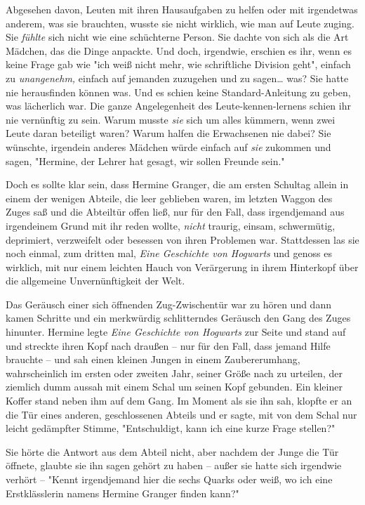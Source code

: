 {Abgesehen davon, Leuten mit ihren Hausaufgaben zu helfen oder mit irgendetwas anderem, was sie brauchten, wusste sie nicht wirklich, wie man auf Leute zuging. Sie \emph{fühlte} sich nicht wie eine schüchterne Person. Sie dachte von sich als die Art Mädchen, das die Dinge anpackte. Und doch, irgendwie, erschien es ihr, wenn es keine Frage gab wie "ich weiß nicht mehr, wie schriftliche Division geht", einfach zu \emph{unangenehm,} einfach auf jemanden zuzugehen und zu sagen… was? Sie hatte nie herausfinden können was. Und es schien keine Standard-Anleitung zu geben, was lächerlich war. Die ganze Angelegenheit des Leute-kennen-lernens schien ihr nie vernünftig zu sein. Warum musste \emph{sie} sich um alles kümmern, wenn zwei Leute daran beteiligt waren? Warum halfen die Erwachsenen nie dabei? Sie wünschte, irgendein anderes Mädchen würde einfach auf \emph{sie} zukommen und sagen, "Hermine, der Lehrer hat gesagt, wir sollen Freunde sein."

Doch es sollte klar sein, dass Hermine Granger, die am ersten Schultag allein in einem der wenigen Abteile, die leer geblieben waren, im letzten Waggon des Zuges saß und die Abteiltür offen ließ, nur für den Fall, dass irgendjemand aus irgendeinem Grund mit ihr reden wollte, \emph{nicht} traurig, einsam, schwermütig, deprimiert, verzweifelt oder besessen von ihren Problemen war. Stattdessen las sie noch einmal, zum dritten mal, \emph{Eine Geschichte von Hogwarts} und genoss es wirklich, mit nur einem leichten Hauch von Verärgerung in ihrem Hinterkopf über die allgemeine Unvernünftigkeit der Welt.

Das Geräusch einer sich öffnenden Zug-Zwischentür war zu hören und dann kamen Schritte und ein merkwürdig schlitterndes Geräusch den Gang des Zuges hinunter. Hermine legte \emph{Eine Geschichte von Hogwarts} zur Seite und stand auf und streckte ihren Kopf nach draußen -- nur für den Fall, dass jemand Hilfe brauchte -- und sah einen kleinen Jungen in einem Zaubererumhang, wahrscheinlich im ersten oder zweiten Jahr, seiner Größe nach zu urteilen, der ziemlich dumm aussah mit einem Schal um seinen Kopf gebunden. Ein kleiner Koffer stand neben ihm auf dem Gang. Im Moment als sie ihn sah, klopfte er an die Tür eines anderen, geschlossenen Abteils und er sagte, mit von dem Schal nur leicht gedämpfter Stimme, "Entschuldigt, kann ich eine kurze Frage stellen?"

Sie hörte die Antwort aus dem Abteil nicht, aber nachdem der Junge die Tür öffnete, glaubte sie ihn sagen gehört zu haben -- außer sie hatte sich irgendwie verhört -- "Kennt irgendjemand hier die sechs Quarks oder weiß, wo ich eine Erstklässlerin namens Hermine Granger finden kann?"

}
